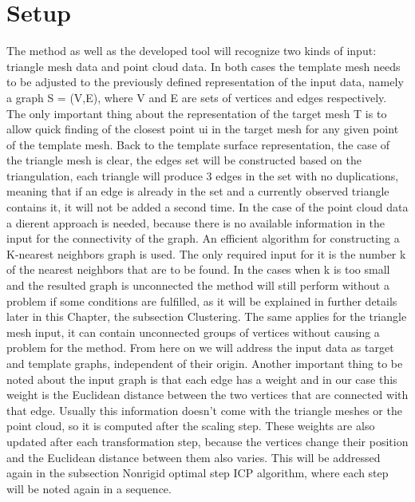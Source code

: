 \documentclass[../structure.tex]{subfiles}
\begin{document}
\section{Setup}
The method as well as the developed tool will recognize two kinds of input:
triangle mesh data and point cloud data. In both cases the template mesh
needs to be adjusted to the previously defined representation of the input
data, namely a graph S = (V,E), where V and E are sets of vertices and
edges respectively. The only important thing about the representation of the
target mesh T is to allow quick finding of the closest point ui in the target
mesh for any given point of the template mesh. Back to the template surface
representation, the case of the triangle mesh is clear, the edges set will be
constructed based on the triangulation, each triangle will produce 3 edges in
the set with no duplications, meaning that if an edge is already in the set
and a currently observed triangle contains it, it will not be added a second
time.
In the case of the point cloud data a dierent approach is needed, because
there is no available information in the input for the connectivity of the graph.
An efficient algorithm for constructing a K-nearest neighbors graph is used.
The only required input for it is the number k of the nearest neighbors
that are to be found. In the cases when k is too small and the resulted
graph is unconnected the method will still perform without a problem if
some conditions are fulfilled, as it will be explained in further details later
in this Chapter, the subsection Clustering. The same applies for the triangle
mesh input, it can contain unconnected groups of vertices without causing a
problem for the method.
From here on we will address the input data as target and template
graphs, independent of their origin. Another important thing to be noted
about the input graph is that each edge has a weight and in our case this
weight is the Euclidean distance between the two vertices that are connected
with that edge. Usually this information doesn’t come with the triangle
meshes or the point cloud, so it is computed after the scaling step. These
weights are also updated after each transformation step, because the vertices
change their position and the Euclidean distance between them also varies.
This will be addressed again in the subsection Nonrigid optimal step ICP
algorithm, where each step will be noted again in a sequence.
\end{document}
